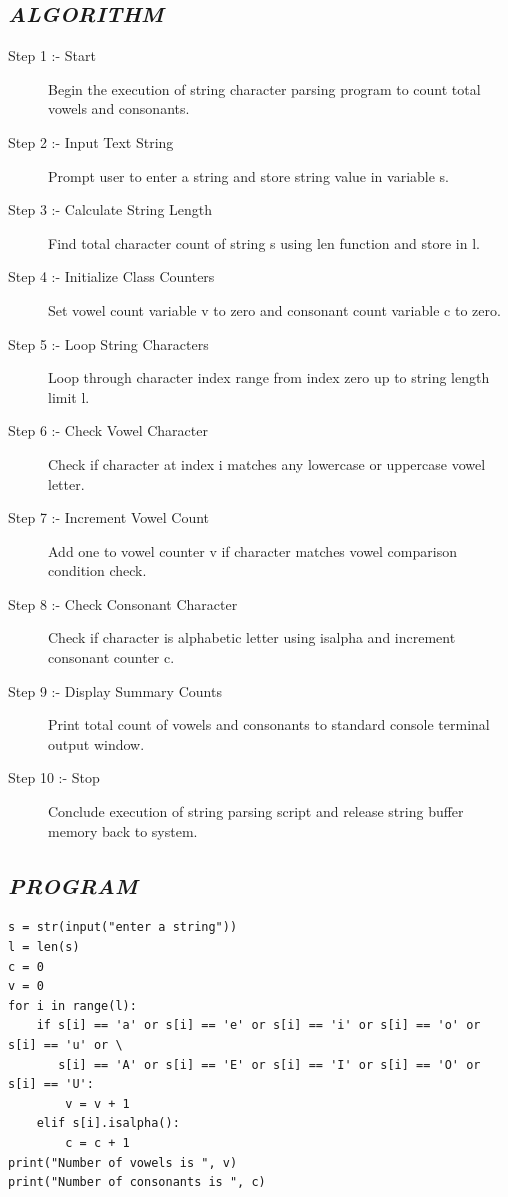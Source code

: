 \documentclass[11pt,a4paper]{article}
\begin{document}
\subsection*{\textit{ALGORITHM}}
\begin{description}
  \item[Step 1 :- Start] Begin the execution of string character parsing program to count total vowels and consonants.
  \item[Step 2 :- Input Text String] Prompt user to enter a string and store string value in variable s.
  \item[Step 3 :- Calculate String Length] Find total character count of string s using len function and store in l.
  \item[Step 4 :- Initialize Class Counters] Set vowel count variable v to zero and consonant count variable c to zero.
  \item[Step 5 :- Loop String Characters] Loop through character index range from index zero up to string length limit l.
  \item[Step 6 :- Check Vowel Character] Check if character at index i matches any lowercase or uppercase vowel letter.
  \item[Step 7 :- Increment Vowel Count] Add one to vowel counter v if character matches vowel comparison condition check.
  \item[Step 8 :- Check Consonant Character] Check if character is alphabetic letter using isalpha and increment consonant counter c.
  \item[Step 9 :- Display Summary Counts] Print total count of vowels and consonants to standard console terminal output window.
  \item[Step 10 :- Stop] Conclude execution of string parsing script and release string buffer memory back to system.
\end{description}

\subsection*{\textit{PROGRAM}}
\begin{lstlisting}[style=pythonstyle]
s = str(input("enter a string")) 
l = len(s) 
c = 0 
v = 0 
for i in range(l): 
    if s[i] == 'a' or s[i] == 'e' or s[i] == 'i' or s[i] == 'o' or s[i] == 'u' or \
       s[i] == 'A' or s[i] == 'E' or s[i] == 'I' or s[i] == 'O' or s[i] == 'U': 
        v = v + 1 
    elif s[i].isalpha(): 
        c = c + 1 
print("Number of vowels is ", v) 
print("Number of consonants is ", c)
\end{lstlisting}
\end{document}
